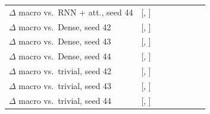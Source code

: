 \begin{tabular}{lccccccc}
$\Delta$ macro vs.\ RNN + att., seed 44 & \transformerDiffRnnAttnSFourFour{} [\transformerDiffRnnAttnLoSFourFour{}, \transformerDiffRnnAttnHiSFourFour{}] & & & & & & \\
$\Delta$ macro vs.\ Dense, seed 42 & \transformerDiffDenseSFourTwo{} [\transformerDiffDenseLoSFourTwo{}, \transformerDiffDenseHiSFourTwo{}] & & & & & & \\
$\Delta$ macro vs.\ Dense, seed 43 & \transformerDiffDenseSFourThree{} [\transformerDiffDenseLoSFourThree{}, \transformerDiffDenseHiSFourThree{}] & & & & & & \\
$\Delta$ macro vs.\ Dense, seed 44 & \transformerDiffDenseSFourFour{} [\transformerDiffDenseLoSFourFour{}, \transformerDiffDenseHiSFourFour{}] & & & & & & \\
$\Delta$ macro vs.\ trivial, seed 42 & \transformerDiffTrivialSFourTwo{} [\transformerDiffTrivialLoSFourTwo{}, \transformerDiffTrivialHiSFourTwo{}] & & & & & & \\
$\Delta$ macro vs.\ trivial, seed 43 & \transformerDiffTrivialSFourThree{} [\transformerDiffTrivialLoSFourThree{}, \transformerDiffTrivialHiSFourThree{}] & & & & & & \\
$\Delta$ macro vs.\ trivial, seed 44 & \transformerDiffTrivialSFourFour{} [\transformerDiffTrivialLoSFourFour{}, \transformerDiffTrivialHiSFourFour{}] & & & & & & \\
\bottomrule
\end{tabular}
